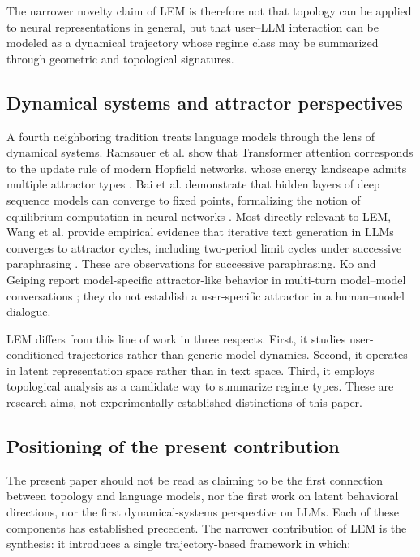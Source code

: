 \documentclass[11pt]{article}
\begin{document}
The narrower novelty claim of LEM is therefore not that topology can be applied to
neural representations in general, but that user--LLM interaction can be modeled as a
dynamical trajectory whose regime class may be summarized through geometric and
topological signatures.

\subsection{Dynamical systems and attractor perspectives}

A fourth neighboring tradition treats language models through the lens of dynamical
systems. Ramsauer et al. show that Transformer attention corresponds to the update
rule of modern Hopfield networks, whose energy landscape admits multiple attractor
types \cite{ramsauer2021hopfield}. Bai et al. demonstrate that hidden layers of deep
sequence models can converge to fixed points, formalizing the notion of equilibrium
computation in neural networks \cite{bai2019deq}. Most directly relevant to LEM, Wang
et al. provide empirical evidence that iterative text generation in LLMs converges to
attractor cycles, including two-period limit cycles under successive paraphrasing
\cite{wang2025attractorcycles}. These are observations for successive paraphrasing.
Ko and Geiping report model-specific attractor-like behavior in multi-turn
model--model conversations \cite{ko2026attractor}; they do not establish a
user-specific attractor in a human--model dialogue.

LEM differs from this line of work in three respects. First, it studies
user-conditioned trajectories rather than generic model dynamics. Second, it operates
in latent representation space rather than in text space. Third, it employs
topological analysis as a candidate way to summarize regime types. These are
research aims, not experimentally established distinctions of this paper.

\subsection{Positioning of the present contribution}

The present paper should not be read as claiming to be the first connection between
topology and language models, nor the first work on latent behavioral directions, nor
the first dynamical-systems perspective on LLMs. Each of these components has
established precedent. The narrower contribution of LEM is the synthesis: it
introduces a single trajectory-based framework in which:
\end{document}
